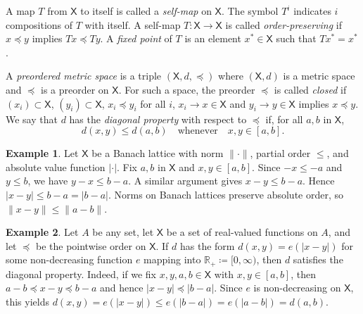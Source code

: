 \documentclass[12pt,reqno]{amsart}
\numberwithin{equation}{section}
\theoremstyle{definition}
\newtheorem{example}{Example}[section]
\newcommand{\1}{\mathbbm{1}}
\newcommand{\R}{\mathbb{R}}
\newcommand{\Xsf}{\mathsf{X}}
\newcommand{\navy}[1]{\textit{\textcolor{blue!40!black}{#1}}}
\begin{document}
A map $T$ from $\Xsf$ to itself is called a \navy{self-map} on $\Xsf$. The symbol $T^i$
indicates $i$ compositions of $T$ with itself. A self-map $T \colon \Xsf
\rightarrow \Xsf$ is called \navy{order-preserving} if $x \preceq y$ implies $T
x \preceq T y$.  A \navy{fixed point} of $T$ is an element $x^* \in \Xsf$ such
that $T x^* = x^*$.   

A \navy{preordered metric space} is a triple $(\Xsf, d, \preceq)$ where $(\Xsf,
d)$ is a metric space and $\preceq$ is a preorder on $\Xsf$. For such a space,
the preorder $\preceq$ is called \navy{closed} if $(x_i) \subset \Xsf$, $(y_i)
\subset \Xsf$, $x_i \preceq y_i$ for all $i$, $x_i \to x \in \Xsf$ and $y_i \to
y \in \Xsf$ implies $x \preceq y$.
We say that $d$ has the \navy{diagonal property}
with respect to $\preceq$ if, for all $a, b$ in $\Xsf$,
%
\begin{equation}\label{eq:diag}
    d(x, y) \leq d(a, b) 
    \quad \text{whenever} \quad
    x, y \in [a, b].
\end{equation}
%

\begin{example} \label{ex:becarre}
    Let $\Xsf$ be a Banach lattice with norm $\| \cdot \|$, partial order
    $\leq$, and absolute value function $| \cdot |$.
    Fix $a, b$ in $\Xsf$ and $x, y \in [a, b]$.  Since $-x \leq -a$
    and $y \leq b$, we have $y-x \leq b - a$.
    A similar argument gives $x-y \leq b - a$.  Hence $|x-y| \leq b - a = |b-a|$.
    Norms on Banach lattices preserve absolute order, so
    $\|x-y\| \leq \|a - b\|$. 
\end{example}

\begin{example}\label{ex:rfa}
    Let $A$ be any set, let $\Xsf$ be a set of real-valued functions on
    $A$, and let $\preceq$ be the pointwise order on $\Xsf$. If $d$ has the
    form $d(x,y) = e(|x-y|)$ for some non-decreasing function $e$ mapping into
    $\R_{+} \coloneq [0,\infty)$, then $d$ satisfies the diagonal
    property. Indeed, if we fix $x, y, a, b \in \Xsf$ with
    $x, y \in [a, b]$, then $a - b \preceq x-y \preceq b - a$ and hence $|x - y|
    \preceq |b - a|$.  Since $e$ is non-decreasing on $\Xsf$, this yields
        $d(x,y) = e(|x - y|) 
        \leq e(|b - a|) 
        = e(|a - b |) 
        = d(a,b)$.
\end{example}
\end{document}
